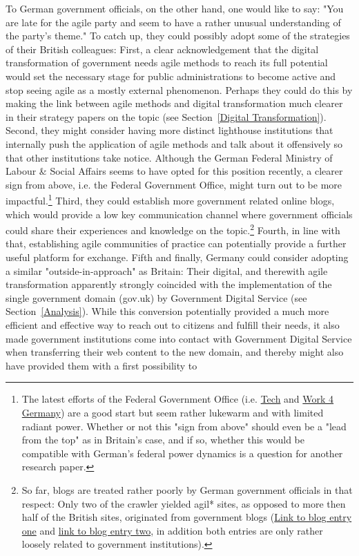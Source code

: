 To German government officials, on the other hand, one would like to say: "You are late for the agile party and seem to have a rather unusual understanding of the party's theme." To catch up, they could possibly adopt some of the strategies of their British colleagues: First, a clear acknowledgement that the digital transformation of government needs agile methods to reach its full potential would set the necessary stage for public administrations to become active and stop seeing agile as a mostly external phenomenon. Perhaps they could do this by making the link between agile methods and digital transformation much clearer in their strategy papers on the topic (see Section~\ref{Digital Transformation}). Second, they might consider having more distinct lighthouse institutions that internally push the application of agile methods and talk about it offensively so that other institutions take notice. Although the German Federal Ministry of Labour \& Social Affairs seems to have opted for this position recently, a clearer sign from above, i.e. the Federal Government Office, might turn out to be more impactful.\footnote{The latest efforts of the Federal Government Office (i.e. \href{https://tech.4germany.org/}{Tech} and \href{https://work.4germany.org/}{Work 4 Germany}) are a good start but seem rather lukewarm and with limited radiant power. Whether or not this "sign from above" should even be a "lead from the top" as in Britain's case, and if so, whether this would be compatible with German's federal power dynamics is a question for another research paper.} Third, they could establish more government related online blogs, which would provide a low key communication channel where government officials could share their experiences and knowledge on the topic.\footnote{So far, blogs are treated rather poorly by German government officials in that respect: Only two of the crawler yielded agil* sites, as opposed to more then half of the British sites, originated from government blogs (\href{https://mb.sachsen-anhalt.de/start/blog-detailansicht/?cHash=76b9e1e8417e5e36ae5105ad14afa4f2&tx_t3extblog_blogsystem\%5Baction\%5D=show&tx_t3extblog_blogsystem\%5Bday\%5D=23&tx_t3extblog_blogsystem\%5Bmonth\%5D=06&tx_t3extblog_blogsystem\%5Bpost\%5D=267&tx_t3extblog_blogsystem\%5Byear\%5D=2018}{Link to blog entry one} and \href{https://frauenseiten.bremen.de/blog/internationales-sommerstudium-informatica-feminale/}{link to blog entry two}, in addition both entries are only rather loosely related to government institutions).} Fourth, in line with that, establishing agile communities of practice can potentially provide a further useful platform for exchange. Fifth and finally, Germany could consider adopting a similar "outside-in-approach" as Britain: Their digital, and therewith agile transformation apparently strongly coincided with the implementation of the single government domain (gov.uk) by Government Digital Service (see Section~\ref{Analysis}). While this conversion potentially provided a much more efficient and effective way to reach out to citizens and fulfill their needs, it also made government institutions come into contact with Government Digital Service when transferring their web content to the new domain, and thereby might also have provided them with a first possibility to 